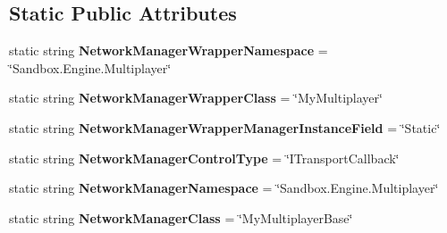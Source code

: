\subsection*{Static Public Attributes}
\begin{DoxyCompactItemize}
\item 
\hypertarget{class_s_e_mod_a_p_i_internal_1_1_a_p_i_1_1_common_1_1_network_manager_a119838670589df4560106e533a7a27ee}{}static string {\bfseries Network\+Manager\+Wrapper\+Namespace} = \char`\"{}Sandbox.\+Engine.\+Multiplayer\char`\"{}\label{class_s_e_mod_a_p_i_internal_1_1_a_p_i_1_1_common_1_1_network_manager_a119838670589df4560106e533a7a27ee}

\item 
\hypertarget{class_s_e_mod_a_p_i_internal_1_1_a_p_i_1_1_common_1_1_network_manager_a8d2381f0887c8895b8215b082ca15c72}{}static string {\bfseries Network\+Manager\+Wrapper\+Class} = \char`\"{}My\+Multiplayer\char`\"{}\label{class_s_e_mod_a_p_i_internal_1_1_a_p_i_1_1_common_1_1_network_manager_a8d2381f0887c8895b8215b082ca15c72}

\item 
\hypertarget{class_s_e_mod_a_p_i_internal_1_1_a_p_i_1_1_common_1_1_network_manager_aee24c27c8a13a9655ebff22315367b8d}{}static string {\bfseries Network\+Manager\+Wrapper\+Manager\+Instance\+Field} = \char`\"{}Static\char`\"{}\label{class_s_e_mod_a_p_i_internal_1_1_a_p_i_1_1_common_1_1_network_manager_aee24c27c8a13a9655ebff22315367b8d}

\item 
\hypertarget{class_s_e_mod_a_p_i_internal_1_1_a_p_i_1_1_common_1_1_network_manager_a6ead81eadae52b48dc522f9b700820bc}{}static string {\bfseries Network\+Manager\+Control\+Type} = \char`\"{}I\+Transport\+Callback\char`\"{}\label{class_s_e_mod_a_p_i_internal_1_1_a_p_i_1_1_common_1_1_network_manager_a6ead81eadae52b48dc522f9b700820bc}

\item 
\hypertarget{class_s_e_mod_a_p_i_internal_1_1_a_p_i_1_1_common_1_1_network_manager_a21fdefccc2127fbbc67cd56c801c2999}{}static string {\bfseries Network\+Manager\+Namespace} = \char`\"{}Sandbox.\+Engine.\+Multiplayer\char`\"{}\label{class_s_e_mod_a_p_i_internal_1_1_a_p_i_1_1_common_1_1_network_manager_a21fdefccc2127fbbc67cd56c801c2999}

\item 
\hypertarget{class_s_e_mod_a_p_i_internal_1_1_a_p_i_1_1_common_1_1_network_manager_ab64b440f88346bc7e57bdf9d53eaf030}{}static string {\bfseries Network\+Manager\+Class} = \char`\"{}My\+Multiplayer\+Base\char`\"{}\label{class_s_e_mod_a_p_i_internal_1_1_a_p_i_1_1_common_1_1_network_manager_ab64b440f88346bc7e57bdf9d53eaf030}


\end{DoxyCompactItemize}
